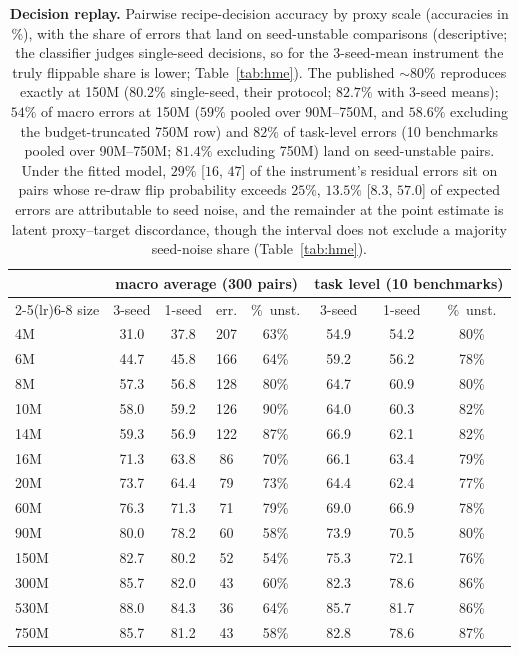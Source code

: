\begin{table}[!htbp]
\centering
\caption{\textbf{Decision replay.} Pairwise recipe-decision accuracy by proxy scale (accuracies
in \%), with the
share of errors that land on seed-unstable comparisons (descriptive; the classifier judges
single-seed decisions, so for the 3-seed-mean instrument the truly flippable share is
lower; Table~\ref{tab:hme}). The published ${\sim}80\%$ reproduces exactly at 150M
($80.2\%$ single-seed, their protocol; $82.7\%$ with 3-seed means); $54\%$ of macro errors at 150M ($59\%$ pooled over 90M--750M, and $58.6\%$ excluding the budget-truncated 750M row) and $82\%$ of
task-level errors (10 benchmarks pooled over 90M--750M; $81.4\%$ excluding 750M) land on
seed-unstable pairs. Under the fitted model, $29\%$ [$16$, $47$] of the instrument's residual
errors sit on pairs whose re-draw flip probability exceeds $25\%$, $13.5\%$ [$8.3$, $57.0$] of expected errors
are attributable to seed noise, and the remainder at the point estimate is latent
proxy--target discordance, though the interval does not exclude a majority seed-noise share
(Table~\ref{tab:hme}).}
\label{tab:t3}
\scriptsize
\setlength{\tabcolsep}{4pt}
\begin{tabular}{@{}lccccccc@{}}
\toprule
& \multicolumn{4}{c}{macro average (300 pairs)} & \multicolumn{3}{c}{task level (10 benchmarks)} \\
\cmidrule(lr){2-5}\cmidrule(lr){6-8}
size & 3-seed & 1-seed & err. & \%\ unst. & 3-seed & 1-seed & \%\ unst. \\
\midrule
4M & 31.0 & 37.8 & 207 & 63\% & 54.9 & 54.2 & 80\% \\
6M & 44.7 & 45.8 & 166 & 64\% & 59.2 & 56.2 & 78\% \\
8M & 57.3 & 56.8 & 128 & 80\% & 64.7 & 60.9 & 80\% \\
10M & 58.0 & 59.2 & 126 & 90\% & 64.0 & 60.3 & 82\% \\
14M & 59.3 & 56.9 & 122 & 87\% & 66.9 & 62.1 & 82\% \\
16M & 71.3 & 63.8 & 86 & 70\% & 66.1 & 63.4 & 79\% \\
20M & 73.7 & 64.4 & 79 & 73\% & 64.4 & 62.4 & 77\% \\
60M & 76.3 & 71.3 & 71 & 79\% & 69.0 & 66.9 & 78\% \\
90M & 80.0 & 78.2 & 60 & 58\% & 73.9 & 70.5 & 80\% \\
150M & 82.7 & 80.2 & 52 & 54\% & 75.3 & 72.1 & 76\% \\
300M & 85.7 & 82.0 & 43 & 60\% & 82.3 & 78.6 & 86\% \\
530M & 88.0 & 84.3 & 36 & 64\% & 85.7 & 81.7 & 86\% \\
750M & 85.7 & 81.2 & 43 & 58\% & 82.8 & 78.6 & 87\% \\
\bottomrule
\end{tabular}
\end{table}


